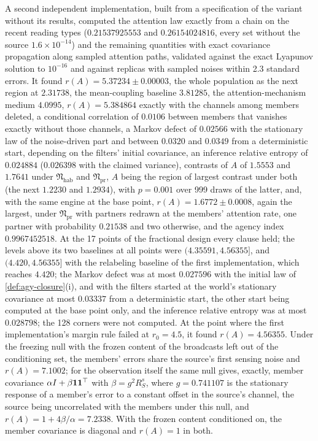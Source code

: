 \begin{numcheck}
A second independent implementation, built from a specification of the variant without its results, computed the attention law exactly from a chain on the recent reading types ($0.21537925553$ and $0.26154024816$, every set without the source $1.6\times10^{-14}$) and the remaining quantities with exact covariance propagation along sampled attention paths, validated against the exact Lyapunov solution to $10^{-16}$ and against replicas with sampled noises within 2.3 standard errors. It found $r(A)=5.37234\pm0.00003$, the whole population as the next region at $2.31738$, the mean-coupling baseline $3.81285$, the attention-mechanism medium $4.0995$, $r(A)=5.384864$ exactly with the channels among members deleted, a conditional correlation of $0.0106$ between members that vanishes exactly without those channels, a Markov defect of $0.02566$ with the stationary law of the noise-driven part and between $0.0320$ and $0.0349$ from a deterministic start, depending on the filters' initial covariance, an inference relative entropy of $0.024884$ ($0.026398$ with the claimed variance), contrasts of $A$ of $1.5553$ and $1.7641$ under $\mathfrak N_{\mathrm{hab}}$ and $\mathfrak N_{\mathrm{pr}}$, $A$ being the region of largest contrast under both (the next $1.2230$ and $1.2934$), with $p=0.001$ over 999 draws of the latter, and, with the same engine at the base point, $r(A)=1.6772\pm0.0008$, again the largest, under $\mathfrak N_{\mathrm{pr}}$ with partners redrawn at the members' attention rate, one partner with probability $0.21538$ and two otherwise, and the agency index $0.9967452518$. At the 17 points of the fractional design every clause held; the levels above its two baselines at all points were $(4.35591,4.56355]$, and $(4.420,4.56355]$ with the relabeling baseline of the first implementation, which reaches $4.420$; the Markov defect was at most $0.027596$ with the initial law of \cref{def:agy-closure}(i), and with the filters started at the world's stationary covariance at most $0.03337$ from a deterministic start, the other start being computed at the base point only, and the inference relative entropy was at most $0.028798$; the 128 corners were not computed. At the point where the first implementation's margin rule failed at $r_0=4.5$, it found $r(A)=4.56355$. Under the freezing null with the frozen content of the broadcasts left out of the conditioning set, the members' errors share the source's first sensing noise and $r(A)=7.1002$; for the observation itself the same null gives, exactly, member covariance $\alpha I+\beta\mathbf{1}\mathbf{1}^\top$ with $\beta=g^2R^s_S$, where $g=0.741107$ is the stationary response of a member's error to a constant offset in the source's channel, the source being uncorrelated with the members under this null, and $r(A)=1+4\beta/\alpha=7.2338$. With the frozen content conditioned on, the member covariance is diagonal and $r(A)=1$ in both.


\end{numcheck}
